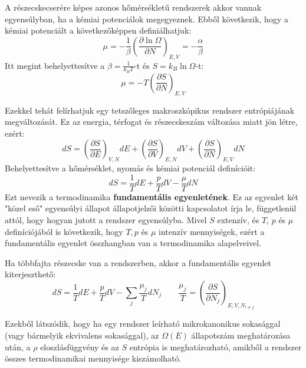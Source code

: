 \documentclass[../main.tex]{subfiles}
\begin{document}
A részecskecserére képes azonos hőmérsékletű rendszerek akkor vannak egyensúlyban, ha a kémiai potenciálok megegyeznek. Ebből következik, hogy a kémiai potenciált a következőképpen definiálhatjuk:
\begin{equation}
    \mu = - \frac{1}{\beta} \left(\frac{\partial \ln \Omega}{\partial N}\right)_{E, V} = - \frac{\alpha}{\beta}
\end{equation}
Itt megint behelyettesítve a $\beta = \frac{1}{k_B T}$-t és $S = k_B \ln \Omega$-t:
\begin{equation}
    \boxed{\mu = - T \left( \frac{\partial S}{\partial N} \right)_{E, V}}
\end{equation}

Ezekkel tehát felírhatjuk egy tetszőleges makroszkópikus rendszer entrópiájának megváltozását. Ez az energia, térfogat és részecskeszám változása miatt jön létre, ezért:
\begin{equation}
    dS = \left( \frac{\partial S}{\partial E} \right)_{V, N} dE + \left( \frac{\partial S}{\partial V} \right)_{E, N} dV + \left( \frac{\partial S}{\partial N} \right)_{E, V} dN
\end{equation}
Behelyettesítve a hőmérséklet, nyomás és kémiai potenciál definícióit:
\begin{equation}
    dS = \frac{1}{T} dE + \frac{p}{T} dV - \frac{\mu}{T} dN
\end{equation}
Ezt nevezik a termodinamika \textbf{fundamentális egyenletének}. Ez az egyenlet két "közel eső" egyensúlyi állapot állapotjelzői közötti kapcsolatot írja le, függetlenül attól, hogy hogyan jutott
a rendszer egyensúlyba. Mivel $S$ extenzív, és $T$, $p$ és $\mu$ definíciójából is következik, hogy $T, p$ és $\mu$ intenzív mennyiségek, ezért a fundamentális egyenlet összhangban van a termodinamika alapelveivel.

Ha többfajta részecske van a rendszerben, akkor a fundamentális egyenlet kiterjeszthető:
\begin{equation}
    dS = \frac{1}{T} dE + \frac{p}{T} dV - \sum_j \frac{\mu_j}{T} dN_j \qquad \frac{\mu_j}{T} = \left(\frac{\partial S}{\partial N_j}\right)_{E, V, N_{i \neq j}}
\end{equation}

Ezekből látszódik, hogy ha egy rendszer leírható mikrokanonikus sokasággal (vagy bármelyik ekvivalens sokasággal), az $\Omega(E)$ állapotszám meghatározása után, a $\rho$ eloszlásfüggvény
és az $S$ entrópia is meghatározható, amikből a rendszer összes termodinamikai mennyisége kiszámolható.
\end{document}
